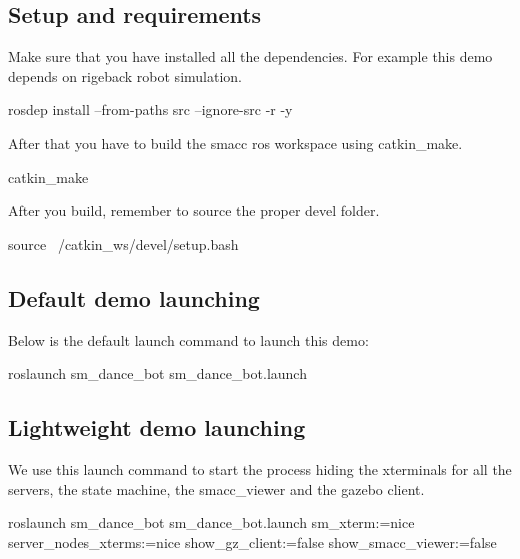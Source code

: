 \subsection*{Setup and requirements}

Make sure that you have installed all the dependencies. For example this demo depends on rigeback robot simulation.


\begin{DoxyCode}
rosdep install --from-paths src --ignore-src -r -y 
\end{DoxyCode}


After that you have to build the smacc ros workspace using catkin\+\_\+make.


\begin{DoxyCode}
catkin\_make
\end{DoxyCode}


After you build, remember to source the proper devel folder.


\begin{DoxyCode}
source ~/catkin\_ws/devel/setup.bash
\end{DoxyCode}


\subsection*{Default demo launching}

Below is the default launch command to launch this demo\+:


\begin{DoxyCode}
roslaunch sm\_dance\_bot sm\_dance\_bot.launch
\end{DoxyCode}


\subsection*{Lightweight demo launching}

We use this launch command to start the process hiding the xterminals for all the servers, the state machine, the smacc\+\_\+viewer and the gazebo client.


\begin{DoxyCode}
roslaunch sm\_dance\_bot sm\_dance\_bot.launch sm\_xterm:=nice server\_nodes\_xterms:=nice show\_gz\_client:=false
       show\_smacc\_viewer:=false
\end{DoxyCode}
 